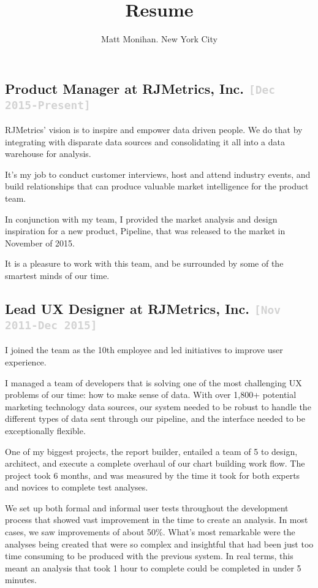 \documentclass{tufte-handout}
\title{Resume}
\author{Matt Monihan. New York City}
\date{} %
\newcommand{\shstandout}[1]{\textbf{\textcolor{BurntOrange}{#1}}}
\newcommand{\shyears}[1]{\small{\texttt{\textcolor{LightGray}{#1}}}}
\begin{document}
\maketitle

\subsection{\textbf{Product Manager} at \shstandout{RJMetrics, Inc.} \shyears{[Dec 2015-Present]}}

RJMetrics' vision is to inspire and empower data driven people. We do that by integrating with disparate data sources and consolidating it all into a data warehouse for analysis.

It's my job to conduct customer interviews, host and attend industry events, and build relationships that can produce valuable market intelligence for the product team.

In conjunction with my team, I provided the market analysis and design inspiration for a new product, Pipeline, that was released to the market in November of 2015.

It is a pleasure to work with this team, and be surrounded by some of the smartest minds of our time.

\subsection{\textbf{Lead UX Designer} at \shstandout{RJMetrics, Inc.} \shyears{[Nov 2011-Dec 2015]}}

I joined the team as the 10th employee and led initiatives to improve user experience.

I managed a team of developers that is solving one of the most challenging UX problems of our time: how to make sense of data. With over 1,800+ potential marketing technology data sources, our system needed to be robust to handle the different types of data sent through our pipeline, and the interface needed to be exceptionally flexible.

One of my biggest projects, the report builder, entailed a team of 5 to design, architect, and execute a complete overhaul of our chart building work flow. The project took 6 months, and was measured by the time it took for both experts and novices to complete test analyses.

We set up both formal and informal user tests throughout the development process that showed vast improvement in the time to create an analysis. In most cases, we saw improvements of about 50\%. What's most remarkable were the analyses being created that were so complex and insightful that had been just too time consuming to be produced with the previous system. In real terms, this meant an analysis that took 1 hour to complete could be completed in under 5 minutes.
\end{document}
